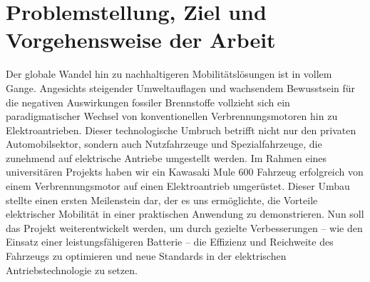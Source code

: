 \chapter{Problemstellung, Ziel und Vorgehensweise der Arbeit}
\label{cha:Problemstellung, Ziel und Vorgehensweise der Arbeit}

Der globale Wandel hin zu nachhaltigeren Mobilitätslösungen ist in vollem Gange. Angesichts steigender Umweltauflagen und wachsendem Bewusstsein für die negativen Auswirkungen fossiler Brennstoffe vollzieht sich ein paradigmatischer Wechsel von konventionellen Verbrennungsmotoren hin zu Elektroantrieben. Dieser technologische Umbruch betrifft nicht nur den privaten Automobilsektor, sondern auch Nutzfahrzeuge und Spezialfahrzeuge, die zunehmend auf elektrische Antriebe umgestellt werden.\autocite{Pischinger2023}
Im Rahmen eines universitären Projekts haben wir ein Kawasaki Mule 600 Fahrzeug erfolgreich von einem Verbrennungsmotor auf einen Elektroantrieb umgerüstet. Dieser Umbau stellte einen ersten Meilenstein dar, der es uns ermöglichte, die Vorteile elektrischer Mobilität in einer praktischen Anwendung zu demonstrieren. Nun soll das Projekt weiterentwickelt werden, um durch gezielte Verbesserungen – wie den Einsatz einer leistungsfähigeren Batterie – die Effizienz und Reichweite des Fahrzeugs zu optimieren und neue Standards in der elektrischen Antriebstechnologie zu setzen.

